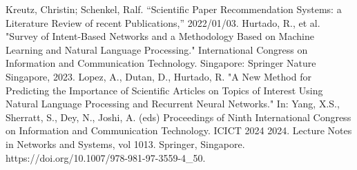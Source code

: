 \documentclass[runningheads]{llncs}
\begin{document}
\begin{thebibliography}{00}
    Kreutz, Christin; Schenkel, Ralf.
    ``Scientific Paper Recommendation Systems: a Literature Review of recent Publications,''
    2022/01/03.
	 Hurtado, R., et al. "Survey of Intent-Based Networks and a Methodology Based on Machine Learning and Natural Language Processing." International Congress on Information and Communication Technology. Singapore: Springer Nature Singapore, 2023.
     Lopez, A., Dutan, D., Hurtado, R. "A New Method for Predicting the Importance of Scientific Articles on Topics of Interest Using Natural Language Processing and Recurrent Neural Networks." In: Yang, X.S., Sherratt, S., Dey, N., Joshi, A. (eds) Proceedings of Ninth International Congress on Information and Communication Technology. ICICT 2024 2024. Lecture Notes in Networks and Systems, vol 1013. Springer, Singapore. https://doi.org/10.1007/978-981-97-3559-4\_50.
\end{thebibliography}
\end{document}
